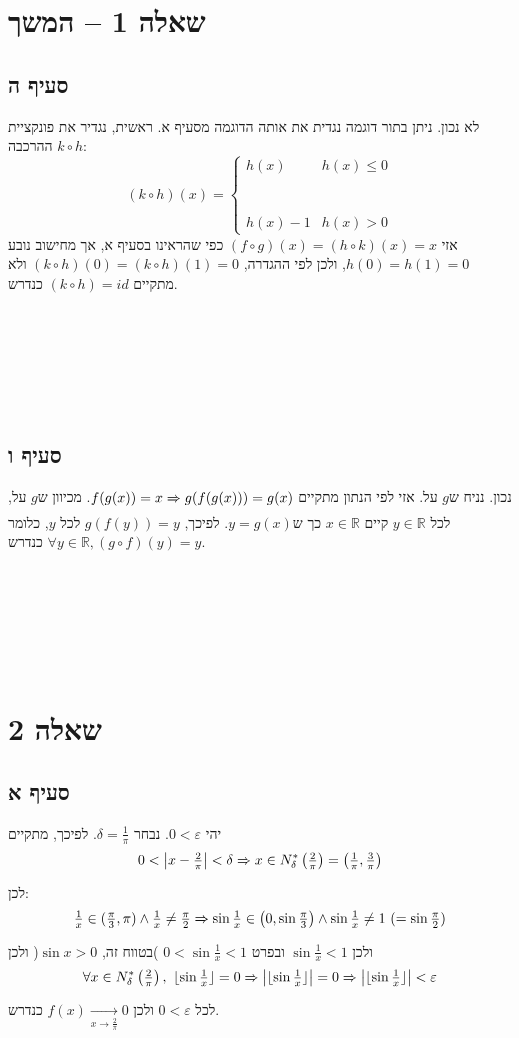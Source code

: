 \documentclass[11pt, oneside]{article}
\newcommand{\qed}{\R{$\blacksquare$}}
\newcommand{\br}{\\\\\\\\\\\\\\}
\newcommand{\opr}[1]{\xrightarrow[\text{#1}]{}}
\newcommand{\logr}[1]{\xRightarrow[\text{#1}]{}}
\newcommand{\mR}{\mathbb{R}}
\DeclarePairedDelimiter{\floor}{\lfloor}{\rfloor}
\DeclarePairedDelimiter{\abs}{\lvert}{\rvert}
\begin{document}
\section*{שאלה 1 -- המשך}
\subsection*{סעיף ה}
לא נכון. ניתן בתור דוגמה נגדית את אותה הדוגמה מסעיף א. ראשית, נגדיר את פונקציית ההרכבה $k \circ h$:
\[
(k \circ h)(x) = \begin{cases}
h(x) & h(x) \le 0\br
h(x) - 1 & h(x) > 0
\end{cases}
\]
אזי $(f \circ g)(x) = (h \circ k)(x) = x$ כפי שהראינו בסעיף א, אך מחישוב נובע $h(0) = h(1) = 0$, ולכן לפי ההגדרה, $(k \circ h)(0) = (k \circ h)(1) = 0$ ולא מתקיים $(k \circ h) = id$ כנדרש.
\br\qed

\subsection*{סעיף ו}
נכון. נניח ש$g$ על. אזי לפי הנתון מתקיים $f(g(x)) = x \logr{} g(f(g(x))) = g(x)$. מכיוון ש$g$ על, לכל $y \in \mR$ קיים $x \in \mR$ כך ש$y = g(x)$. לפיכך, $g(f(y)) = y$ לכל $y$, כלומר $\forall y \in \mR, (g \circ f)(y) = y$ כנדרש.
\br\qed
\clearpage

\section*{שאלה 2}
\subsection*{סעיף א}
יהי $0 < \varepsilon$. נבחר $\delta = \frac{1}{\pi}$. לפיכך, מתקיים
\[
0 < \abs*{x - \tfrac{2}{\pi}} < \delta \logr{} x \in N^{*}_{\delta}\left(\tfrac{2}{\pi}\right) = \left(\tfrac{1}{\pi}, \tfrac{3}{\pi}\right)
\]
לכן:
\[
\tfrac{1}{x} \in (\tfrac{\pi}{3}, \pi) \land \tfrac{1}{x} \neq \tfrac{\pi}{2}
\logr{}
\sin{\tfrac{1}{x}} \in \left(0, \sin{\tfrac{\pi}{3}}\right)  \land \sin{\tfrac{1}{x}} \neq 1\ (= \sin{\tfrac{\pi}{2}})
\]
ולכן $\sin{\tfrac{1}{x}} < 1$ ובפרט $0 < \sin{\tfrac{1}{x}} < 1$ )בטווח זה, $\sin{x} > 0$( ולכן
\[
\forall x \in N^{*}_{\delta}\left(\tfrac{2}{\pi}\right),\ \floor{\sin{\tfrac{1}{x}}} = 0
\logr{} \abs*{\floor{\sin{\tfrac{1}{x}}}} = 0
\logr{} \abs*{\floor{\sin{\tfrac{1}{x}}}} < \varepsilon
\]
לכל $0 < \varepsilon$ ולכן $f(x) \opr{$x \to \tfrac{2}{\pi}$} 0$ כנדרש.
\br\qed
\end{document}
